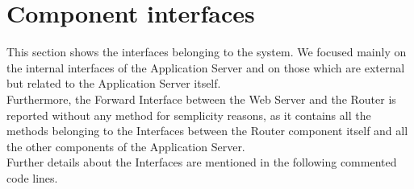 \documentclass[../../DD.tex]{subfiles}
\begin{document}
\section{Component interfaces\label{sect:2.5}}

This section shows the interfaces belonging to the system. We focused mainly on the internal interfaces of the Application Server and on those which are external but related to the Application Server itself.\\
Furthermore, the Forward Interface between the Web Server and the Router is reported without any method for semplicity reasons, as it contains all the methods belonging to the Interfaces between the Router component itself and all the other components of the Application Server.\\
Further details about the Interfaces are mentioned in the following commented code lines.\\
\end{document}
